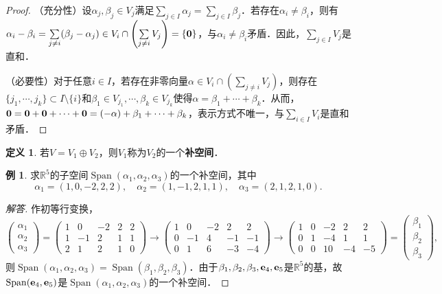 \documentclass[a4paper,fontset=windows]{ctexbook}
\theoremstyle{definition}
\newtheorem{definition}{定义}[chapter]
\newtheorem{example}{例}[chapter]
\DeclareMathOperator{\Span}{Span}
\begin{document}
\begin{proof}
（充分性）设$\alpha_j,\beta_j\in V_j$满足$\sum\limits_{j\in I}\alpha_j=\sum\limits_{j\in I}\beta_j$．若存在$\alpha_i\ne\beta_i$，则有$\alpha_i-\beta_i=\sum\limits_{j\ne i}(\beta_j-\alpha_j)\in V_i\cap\left(\sum\limits_{j\ne i}V_j\right)=\{{\bf 0}\}$，与$\alpha_i\ne\beta_i$矛盾．因此，$\sum\limits_{j\in I}V_j$是直和．

（必要性）对于任意$i\in I$，若存在非零向量$\alpha\in V_i\cap\left(\sum\limits_{j\ne i}V_j\right)$，则存在$\{j_1,\cdots,j_k\}\subset I\setminus\{i\}$和$\beta_1\in V_{j_1},\cdots,\beta_k\in V_{j_k}$使得$\alpha=\beta_1+\cdots+\beta_k$．从而，${\bf 0=0+0+\cdots+0}=(-\alpha)+\beta_1+\cdots+\beta_k$，表示方式不唯一，与$\sum\limits_{i\in I}V_i$是直和矛盾．
\end{proof}

\begin{definition}
若$V=V_1\oplus V_2$，则$V_1$称为$V_2$的一个{\bf 补空间}．
\end{definition}

\begin{example}
求$\mathbb{R}^5$的子空间$\Span(\alpha_1,\alpha_2,\alpha_3)$的一个补空间，其中
$$\alpha_1=(1,0,-2,2,2),\quad\alpha_2=(1,-1,2,1,1),\quad\alpha_3=(2,1,2,1,0).$$
\end{example}

\begin{proof}[解答]
作初等行变换，
$$\begin{pmatrix}\alpha_1 \\ \alpha_2 \\ \alpha_3\end{pmatrix}=\begin{pmatrix}1&0&-2&2&2 \\ 1&-1&2&1&1 \\ 2&1&2&1&0\end{pmatrix}\to\begin{pmatrix}1&0&-2&2&2 \\ 0&-1&4&-1&-1 \\ 0&1&6&-3&-4\end{pmatrix}\to\begin{pmatrix}1&0&-2&2&2 \\ 0&1&-4&1&1 \\ 0&0&10&-4&-5\end{pmatrix}=\begin{pmatrix}\beta_1 \\ \beta_2 \\ \beta_3\end{pmatrix},$$
则$\Span(\alpha_1,\alpha_2,\alpha_3)=\Span(\beta_1,\beta_2,\beta_3)$．由于$\beta_1,\beta_2,\beta_3,{\bf e}_4,{\bf e}_5$是$\mathbb{R}^5$的基，故$\Span({\bf e}_4,{\bf e}_5)$是$\Span(\alpha_1,\alpha_2,\alpha_3)$的一个补空间．
\end{proof}
\end{document}

